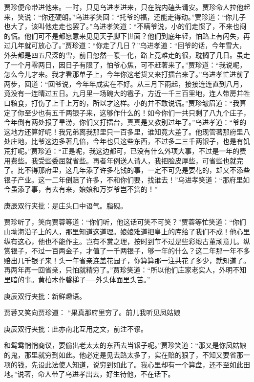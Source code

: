 \begin{parag}


    贾珍便命带进他来。一时，只见乌进孝进来，只在院内磕头请安。贾珍命人拉他起来，笑说：“你还硬朗。”乌进孝笑回：“托爷的福，还能走得动。”贾珍道：“你儿子也大了，该叫他走走也罢了。”乌进孝笑道：“不瞒爷说，小的们走惯了，不来也闷的慌。他们可不是都愿意来见见天子脚下世面？他们到底年轻，怕路上有闪失，再过几年就可放心了。”贾珍道：“你走了几日？”乌进孝道：“回爷的话，今年雪大，外头都是四五尺深的雪，前日忽然一暖一化，路上竟难走的很，耽搁了几日。虽走了一个月零两日，因日子有限了，怕爷心焦，可不赶著来了。”贾珍道：“我说呢，怎么今儿才来。我才看那单子上，今年你这老货又来打擂台来了。”乌进孝忙进前了两步，回道：“回爷说，今年年成实在不好。从三月下雨起，接接连连直到八月，竟没有一连晴过五日。九月里一场碗大的雹子，方近一千三百里地，连人带房并牲口粮食，打伤了上千上万的，所以才这样。小的并不敢说谎。”贾珍皱眉道：“我算定了你至少也有五千两银子来，这够作什么的！如今你们一共只剩了八九个庄子，今年倒有两处报了旱涝，你们又打擂台，真真是又教别过年了。”乌进孝道：“爷的这地方还算好呢！我兄弟离我那里只一百多里，谁知竟大差了。他现管著那府里八处庄地，比爷这边多著几倍，今年也只这些东西，不过多二三千两银子，也是有饥荒打呢。”贾珍道：“正是呢，我这边都可，已没有什么外项大事，不过是一年的费用费些。我受些委屈就省些。再者年例送人请人，我把脸皮厚些，可省些也就完了。比不得那府里，这几年添了许多花钱的事，一定不可免是要花的，却又不添些银子产业。这一二年倒赔了许多，不和你们要，找谁去！”乌进孝笑道：“那府里如今虽添了事，有去有来，娘娘和万岁爷岂不赏的！”\begin{note}庚辰双行夹批：是庄头口中语气。脂砚。\end{note}贾珍听了，笑向贾蓉等道：“你们听，他这话可笑不可笑？”贾蓉等忙笑道：“你们山坳海沿子上的人，那里知道这道理。娘娘难道把皇上的库给了我们不成！他心里纵有这心，他也不能作主。岂有不赏之理，按时到节不过是些彩缎古董顽意儿。纵赏银子，不过一百两金子，才值了一千两银子，够一年的什么？这二年那一年不多赔出几千银子来！头一年省亲连盖花园子，你算算那一注共花了多少，就知道了。再两年再一回省亲，只怕就精穷了。”贾珍笑道：“所以他们庄家老实人，外明不知里暗的事。黄柏木作磬槌子──外头体面里头苦。”\begin{note}庚辰双行夹批：新鲜趣语。\end{note}贾蓉又笑向贾珍道： “果真那府里穷了。前儿我听见凤姑娘\begin{note}庚辰双行夹批：此亦南北互用之文，前注不谬。\end{note}和鸳鸯悄悄商议，要偷出老太太的东西去当银子呢。”贾珍笑道：“那又是你凤姑娘的鬼，那里就穷到如此。他必定是见去路太多了，实在赔的狠了，不知又要省那一项的钱，先设此法使人知道，说穷到如此了。我心里却有一个算盘，还不至如此田地。”说著，命人带了乌进孝出去，好生待他，不在话下。
\end{parag}


